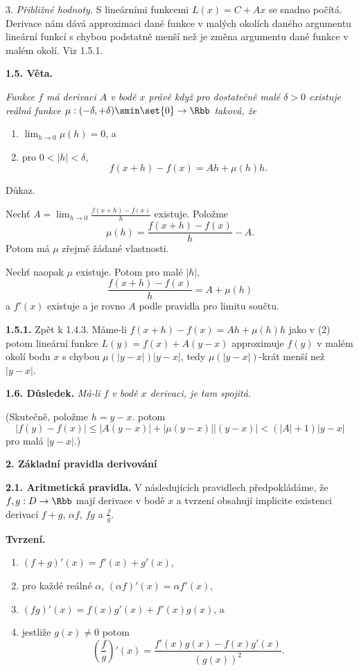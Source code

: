 \documentclass[12pt]{article}
\begin{document}
{ \smallskip
 

3. {\em Přibližné hodnoty.} S lineárními funkcemi $L(x)=C+Ax$ se snadno počítá. Derivace nám dává approximaci dané funkce v malých okolích daného argumentu lineární funkcí s chybou podstatně menší než je změna argumentu dané funkce v malém okolí. Viz 1.5.1.

\bigskip

{\bf 1.5. Věta.} {\em Funkce $f$ má derivaci $A$ v bodě $x$ právě když pro dostatečně malé $\delta>0$ existuje reálná funkce  $\mu:(-\delta,+\delta)\smin\set{0}\to\Rbb$  taková, že
\begin{enumerate}
\item $\lim_{h\to 0}\mu(h)=0$, a
\item pro $0<|h|<\delta$,
$$
f(x+h)-f(x)=Ah+\mu(h)h.
$$
\end{enumerate}

Důkaz.} Nechť $A=\lim_{h\to 0}\frac{f(x+h)-f(x)}{h}$ existuje. Položme
$$
\mu(h)=\frac{f(x+h)-f(x)}{h}- A.
$$
Potom má $\mu$ zřejmě žádané vlastnosti.

Nechť naopak $\mu$ existuje. Potom pro malé $|h|$,
$$
\frac{f(x+h)-f(x)}{h}=A+\mu(h)
$$
a $f'(x)$ existuje a je rovno  $A$ podle pravidla pro limitu součtu. \sq

\medskip

{\bf 1.5.1.} Zpět k 1.4.3. Máme-li $f(x+h)-f(x)=Ah+\mu(h)h$ jako v (2) potom lineární funkce $L(y)=f(x)+A(y-x)$ approximuje $f(y)$ v malém okolí  bodu $x$ s chybou $\mu(|y-x|)|y-x|$, tedy
$\mu(|y-x|)$-krát menší než   $|y-x|$.

\bigskip

{\bf 1.6. Důsledek.} {\em Má-li $f$ v bodě $x$ derivaci, je tam spojitá.}

(Skutečně, položme $h=y-x$. potom
$$
|f(y)-f(x)|\leq |A(y-x)|+|\mu(y-x)||(y-x)|<(|A|+1)|y-x|
$$
pro malá $|y-x|$.)


\vskip10mm
 
 {\large\bf 2. Základní pravidla derivování}
 
 \bigskip
 
 {\bf 2.1. Aritmetická pravidla.} V následujících pravidlech předpokládáme, že $f,g:D\to\Rbb$ mají derivace v bodě $x$ a tvrzení obsahují implicite  existenci derivací $f+g$, $\alpha f$, $fg$ a $\frac{f}{g}$.
 
 \medskip
 
 {\bf Tvrzení.} {\em \begin{enumerate}
 \item $(f+g)'(x)=f'(x)+g'(x)$,
 \item pro každé reálné $\alpha$, $(\alpha f)'(x)=\alpha f'(x)$,
 \item $(fg)'(x)=f(x)g'(x)+f'(x)g(x)$, a
 \item jestliže $g(x)\neq 0$ potom
 $$
 \left(\frac{f}{g}\right)'(x)=\frac{f'(x)g(x)-f(x)g'(x)}{(g(x))^2}.
 $$
 \end{enumerate}
 
}}
\end{document}
